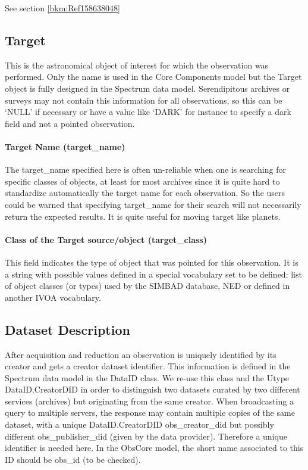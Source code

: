 \documentclass[11pt,a4paper]{ivoa}
\begin{document}
See section \ref{bkm:Ref158638048}

\subsection{Target}
This is the astronomical object of interest for which the observation was performed. Only the name is used in the Core
Components model but the Target object is fully designed in the Spectrum data model. Serendipitous archives or surveys
may not contain this information for all observations, so this can be `NULL' if necessary or have a value like `DARK'
for instance to specify a dark field and not a pointed observation.

\paragraph{Target Name (target\_name)}
The target\_name specified here is often un-reliable when one is searching for specific classes of objects, at least for
most archives since it is quite hard to standardize automatically the target name for each observation. So the users
could be warned that specifying target\_name for their search will not necessarily return the expected results. It is
quite useful for moving target like planets.

\paragraph{Class of the Target source/object (target\_class)}
This field indicates the type of object that was pointed for this observation. It is a string with possible values
defined in a special vocabulary set to be defined: list of object classes (or types) used by the SIMBAD database, NED
or defined in another IVOA vocabulary.

\subsection{Dataset Description}
After acquisition and reduction an observation is uniquely identified by its creator and gets a creator dataset
identifier.  This information is defined in the Spectrum data model in the DataID class. We re-use this class and the
Utype DataID.CreatorDID in order to distinguish two datasets curated by two different services (archives) but
originating from the same creator.  When broadcasting a query to multiple servers, the response may contain multiple
copies of the same dataset, with a unique DataID.CreatorDID obs\_creator\_did but possibly different
obs\_publisher\_did (given by the data provider). Therefore a unique identifier is needed here.  In the ObsCore model,
the short name associated to this ID should be obs\_id (to be checked).
\end{document}
